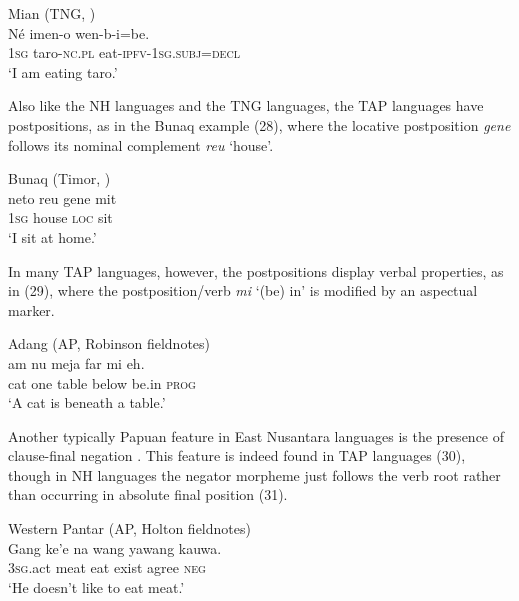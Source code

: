 \ea%
Mian (TNG, \citet[344]{Fedden2011})\\
\gll  N\'e imen-o wen-b-i=be. \\
 \textsc{1sg} taro-\textsc{nc.pl} eat-\textsc{ipfv-1sg.subj=decl}  \\
\glt `I am eating taro.'
\z





Also like the NH languages and the TNG languages, the TAP languages have postpositions, as in the Bunaq example (28), where the locative postposition \textit{gene} follows its nominal complement \textit{reu} `house'.






\ea%
Bunaq (Timor, \citet[104]{Schapper2009})\\
\gll   neto  reu  gene  mit\\
\textsc{1sg}  house  \textsc{loc}  sit\\
\glt `I sit at home.'  \\

\z





In many TAP languages, however, the postpositions display verbal properties, as in (29), where the postposition/verb \textit{mi} `(be) in' is modified by an aspectual marker.


\ea%
Adang (AP, Robinson fieldnotes)\\
\gll  {\textglotstop}am{\textopeno} nu meja far mi eh. \\
   cat one table below be.in \textsc{prog} \\
\glt `A cat is beneath a table.'
\z





Another typically Papuan feature in East Nusantara languages is the presence of clause-final negation \citep{KlamerEtAl2008}. This feature is indeed found in TAP languages (30), though in NH languages the negator morpheme just follows the verb root rather than occurring in absolute final position (31).


\ea%
Western Pantar (AP, Holton fieldnotes)\\
\gll  Gang ke'e na wang yawang kauwa. \\
  \textsc{3sg}.act meat eat exist agree \textsc{neg} \\
\glt `He doesn't like to eat meat.'
\z






